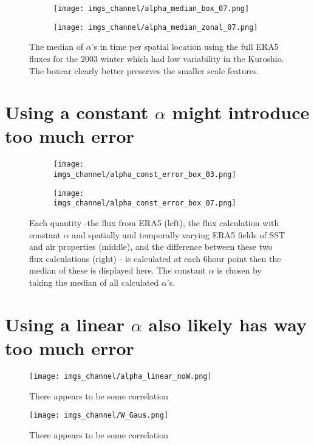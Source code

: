 \documentclass[12pt,a4paper]{article}
\begin{document}
\begin{figure}[h!]
\centering
\begin{subfigure}[t]{\textwidth}
\texttt{[image: imgs\_channel/alpha\_median\_box\_07.png]}
\end{subfigure}
\begin{subfigure}[t]{\textwidth}
\texttt{[image: imgs\_channel/alpha\_median\_zonal\_07.png]}
\end{subfigure}
\caption{The median of $\alpha$'s in time per spatial location using the full ERA5 fluxes for the 2003 winter which had low variability in the Kuroshio. The boxcar clearly better preserves the smaller scale features.}
\end{figure}

\section{Using a constant $\alpha$ might introduce too much error}

\begin{figure}[h!]
\centering
\begin{subfigure}[t]{\textwidth}
\texttt{[image: imgs\_channel/alpha\_const\_error\_box\_03.png]}
\end{subfigure}
\begin{subfigure}[t]{\textwidth}
\texttt{[image: imgs\_channel/alpha\_const\_error\_box\_07.png]}
\end{subfigure}
\caption{Each quantity -the flux from ERA5 (left), the flux calculation with constant $\alpha$ and spatially and temporally varying ERA5 fields of SST and air properties (middle), and the difference between these two flux calculations (right) - is calculated at each 6hour point then the median of these is displayed here. The constant $\alpha$ is chosen by taking the median of all calculated $\alpha$'s.}
\end{figure}

\section{Using a linear $\alpha$ also likely has way too much error}

\begin{figure}[h!]
\centering
\texttt{[image: imgs\_channel/alpha\_linear\_noW.png]}
\caption{There appears to be some correlation}
\end{figure}

\begin{figure}[h!]
\centering
\texttt{[image: imgs\_channel/W\_Gaus.png]}
\caption{There appears to be some correlation}
\end{figure}
\end{document}
